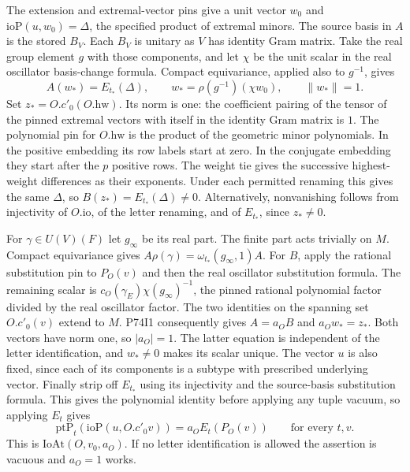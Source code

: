 The extension and extremal-vector pins give a unit vector $w_0$ and
$\mathrm{ioP}(u,w_0)=\Delta$, the specified product of extremal
minors. The source basis in $A$ is the stored $B_V$.
Each $B_V$ is unitary as $V$ has identity Gram matrix. Take the
real group element $g$ with those components, and let $\chi$ be the
unit scalar in the real oscillator basis-change formula. Compact
equivariance, applied also to $g^{-1}$, gives
\[
 A(w_*)=E_{t_*}(\Delta),\qquad
 w_*=\rho(g^{-1})(\chi w_0),\qquad \|w_*\|=1 .
\]
Set $z_*=O.c'_0(O.\mathrm{hw})$. Its norm is one: the coefficient
pairing of the tensor of the pinned extremal vectors with itself in
the identity Gram matrix is $1$. The polynomial pin for $O.\mathrm{hw}$
is the product of the geometric minor polynomials. In the positive
embedding its row labels start at zero. In the conjugate embedding
they start after the $p$ positive rows. The weight tie gives the
successive highest-weight differences as their exponents. Under each
permitted renaming this gives the same $\Delta$, so
$B(z_*)=E_{t_*}(\Delta)\ne0$. Alternatively, nonvanishing follows
from injectivity of $O.\mathrm{io}$, of the letter renaming, and of
$E_{t_*}$, since $z_*\ne0$.

For $\gamma\in U(V)(F)$ let $g_\infty$ be its real part. The finite
part acts trivially on $M$. Compact equivariance gives
$A\rho(\gamma)=\omega_{t_*}(g_\infty,1) A$. For $B$, apply the
rational substitution pin to $P_O(v)$ and then the real oscillator
substitution formula. The remaining scalar is
$c_O(\gamma_E)\chi(g_\infty)^{-1}$, the pinned rational polynomial
factor divided by the real oscillator factor. The two identities on
the spanning set $O.c'_0(v)$ extend to $M$. P74I1 consequently gives
$A=a_OB$ and $a_Ow_*=z_*$. Both vectors have norm one, so $|a_O|=1$.
The latter equation is independent of the letter identification, and
$w_*\ne0$ makes its scalar unique. The vector $u$ is also fixed,
since each of its components is a subtype with prescribed underlying
vector. Finally strip off $E_{t_*}$ using its injectivity and the
source-basis substitution formula. This gives the polynomial identity
before applying any tuple vacuum, so applying $E_t$ gives
\[
 \mathrm{ptP}_t(\mathrm{ioP}(u,O.c'_0 v))
       =a_O E_t(P_O(v))\qquad\text{for every }t,v.
\]
This is $\mathrm{IoAt}(O,v_0,a_O)$. If no letter identification is
allowed the assertion is vacuous and $a_O=1$ works.

